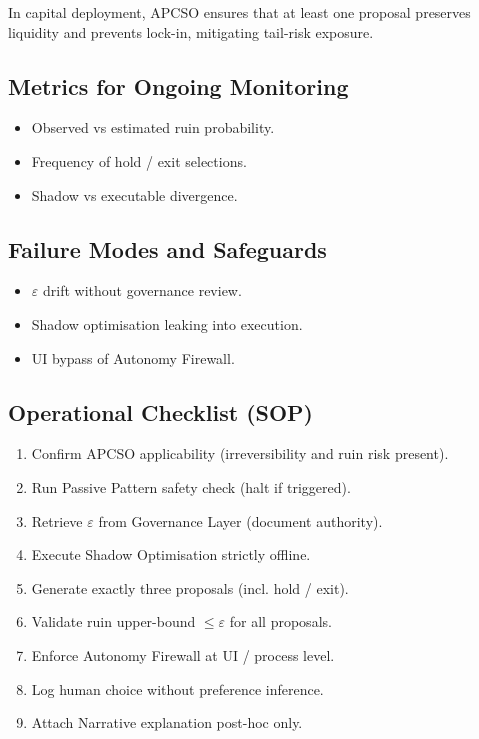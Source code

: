In capital deployment, APCSO ensures that at least one proposal
preserves liquidity and prevents lock-in, mitigating tail-risk
exposure.

\subsection{Metrics for Ongoing Monitoring}

\begin{itemize}
\item Observed vs estimated ruin probability.
\item Frequency of hold / exit selections.
\item Shadow vs executable divergence.
\end{itemize}

\subsection{Failure Modes and Safeguards}

\begin{itemize}
\item $\varepsilon$ drift without governance review.
\item Shadow optimisation leaking into execution.
\item UI bypass of Autonomy Firewall.
\end{itemize}

\subsection{Operational Checklist (SOP)}

\begin{enumerate}
\item Confirm APCSO applicability (irreversibility and ruin risk
present).
\item Run Passive Pattern safety check (halt if triggered).
\item Retrieve $\varepsilon$ from Governance Layer (document
authority).
\item Execute Shadow Optimisation strictly offline.
\item Generate exactly three proposals (incl. hold / exit).
\item Validate ruin upper-bound $\le \varepsilon$ for all proposals.
\item Enforce Autonomy Firewall at UI / process level.
\item Log human choice without preference inference.
\item Attach Narrative explanation post-hoc only.
\end{enumerate}


